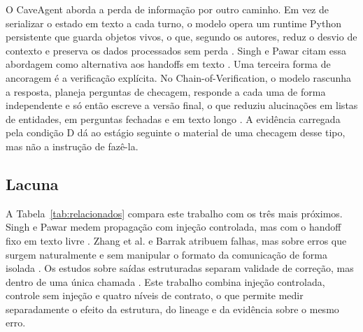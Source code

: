 O CaveAgent aborda a perda de informação por outro caminho.
Em vez de serializar o estado em texto a cada turno, o modelo opera um runtime Python persistente que guarda objetos vivos, o que, segundo os autores, reduz o desvio de contexto e preserva os dados processados sem perda \cite{ran2026caveagent}.
Singh e Pawar citam essa abordagem como alternativa aos handoffs em texto \cite{singh2026snowball}.
Uma terceira forma de ancoragem é a verificação explícita. No Chain-of-Verification, o modelo rascunha a resposta, planeja perguntas de checagem, responde a cada uma de forma independente e só então escreve a versão final, o que reduziu alucinações em listas de entidades, em perguntas fechadas e em texto longo \cite{dhuliawala2023cove}.
A evidência carregada pela condição D dá ao estágio seguinte o material de uma checagem desse tipo, mas não a instrução de fazê-la.

\subsection{Lacuna}\label{sec:rel-lacuna}

A Tabela~\ref{tab:relacionados} compara este trabalho com os três mais próximos.
Singh e Pawar medem propagação com injeção controlada, mas com o handoff fixo em texto livre \cite{singh2026snowball}.
Zhang et al. e Barrak atribuem falhas, mas sobre erros que surgem naturalmente e sem manipular o formato da comunicação de forma isolada \cite{zhang2025which, barrak2025traceability}.
Os estudos sobre saídas estruturadas separam validade de correção, mas dentro de uma única chamada \cite{ray2026constraint, tam2024speak}.
Este trabalho combina injeção controlada, controle sem injeção e quatro níveis de contrato, o que permite medir separadamente o efeito da estrutura, do lineage e da evidência sobre o mesmo erro.

